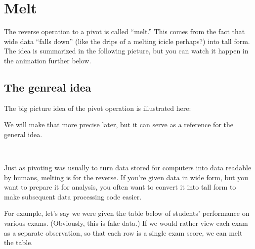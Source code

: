 \documentclass[letterpaper,10pt,english]{sphinxmanual}
\begin{document}
\section{Melt}
\label{\detokenize{chapter-6-single-table-verbs:melt}}
The reverse operation to a pivot is called “melt.”  This comes from the fact that wide data “falls down” (like the drips of a melting icicle perhaps?) into tall form.  The idea is summarized in the following picture, but you can watch it happen in the animation further below.


\subsection{The genreal idea}
\label{\detokenize{chapter-6-single-table-verbs:the-genreal-idea}}
The big picture idea of the pivot operation is illustrated here:



We will make that more precise later, but it can serve as a reference for the general idea.

 

Just as pivoting was usually to turn data stored for computers into data readable by humans, melting is for the reverse.  If you’re given data in wide form, but you want to prepare it for analysis, you often want to convert it into tall form to make subsequent data processing code easier.

For example, let’s say we were given the table below of students’ performance on various exams.  (Obviously, this is fake data.)  If we would rather view each exam as a separate observation, so that each row is a single exam score, we can melt the table.
\end{document}
